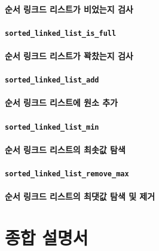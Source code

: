 \documentclass[UTF8, a4paper]{report}
\begin{document}
            \paragraph{%
                \normalfont 순서 링크드 리스트가 비었는지 검사
            }

            \paragraph{\texttt{sorted\_linked\_list\_is\_full   }}
            \paragraph{%
                \normalfont 순서 링크드 리스트가 꽉찼는지 검사
            }

            \paragraph{\texttt{sorted\_linked\_list\_add       }}
            \paragraph{%
                \normalfont 순서 링크드 리스트에 원소 추가
            }

            \paragraph{\texttt{sorted\_linked\_list\_min       }}
            \paragraph{%
                \normalfont 순서 링크드 리스트의 최솟값 탐색
            }

            \paragraph{\texttt{sorted\_linked\_list\_remove\_max}}
            \paragraph{%
                \normalfont 순서 링크드 리스트의 최댓값 탐색 및 제거
            }

        \section{종합 설명서}
\end{document}
